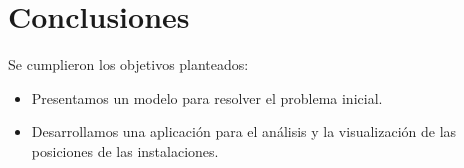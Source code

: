 \section{Conclusiones}

Se cumplieron los objetivos planteados:

\begin{itemize}[label=\textbullet]
    \item Presentamos un modelo para resolver el problema inicial.
    \item Desarrollamos una aplicación para el análisis y la visualización de las posiciones de las instalaciones.
\end{itemize}